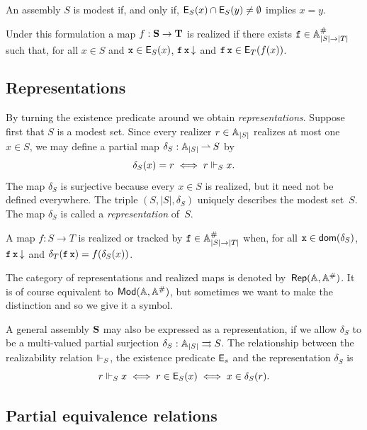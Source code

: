 An assembly $S$ is modest if, and only if, $\mathsf{E}_S(x) \cap \mathsf{E}_S(y)
\neq \emptyset$ implies $x = y$.

Under this formulation a map $f : \mathbf{S} \to \mathbf{T}$ is realized if
there exists $\mathtt{f} \in \mathbb{A}^{\#}_{|S| \to |T|}$ such that, for all $x
\in S$ and $\mathtt{x} \in \mathsf{E}_S(x)$, $\mathtt{f}\,\mathtt{x}\,{\downarrow}$ and
$\mathtt{f}\,\mathtt{x} \in \mathsf{E}_T(f(x))$.

\subsection{Representations}
\label{sec:representations}

By turning the existence predicate around we obtain
\emph{representations}. Suppose first that $S$ is a modest set. Since
every realizer $r \in \mathbb{A}_{|S|}$ realizes at most one $x \in S$, we may
define a partial map $\delta_S : \mathbb{A}_{|S|} \mathbin{\rightharpoonup} S$ by
%
\begin{equation*}
  \delta_S(x) = r \iff r \Vdash_S x.
\end{equation*}
%
The map $\delta_S$ is surjective because every $x \in S$ is realized,
but it need not be defined everywhere. The triple $(S, |S|, \delta_S)$
uniquely describes the modest set~$S$. The map $\delta_S$ is called a
\emph{representation} of~$S$.

A map $f : S \to T$ is realized or tracked by $\mathtt{f} \in \mathbb{A}^{\#}_{|S|
  \to |T|}$ when, for all $\mathtt{x} \in \mathsf{dom}(\delta_S)$,
$\mathtt{f}\,\mathtt{x}\,{\downarrow}$ and $\delta_T(\mathtt{f}\,\mathtt{x}) =
f(\delta_S(x))$.

The category of representations and realized maps is denoted
by~$\mathsf{Rep}(\mathbb{A},\mathbb{A}^{\#})$. It is of course equivalent to $\mathsf{Mod}(\mathbb{A},
  \mathbb{A}^{\#})$, but sometimes we want to make the distinction and so we
give it a symbol.

A general assembly $\mathbf{S}$ may also be expressed as a
representation, if we allow $\delta_S$ to be a multi-valued partial
surjection $\delta_S : \mathbb{A}_{|S|} \rightrightarrows S$. The relationship between
the realizability relation $\Vdash_S$, the existence predicate $\mathsf{E}_s$
and the representation $\delta_S$ is
%
\begin{equation*}
  r \Vdash_S x \iff
  r \in \mathsf{E}_S(x) \iff
  x \in \delta_S(r).
\end{equation*}


\subsection{Partial equivalence relations}
\label{sec:pers}

